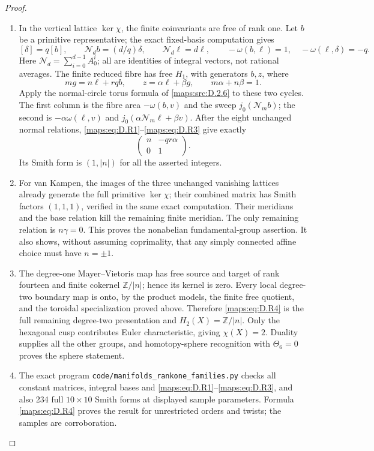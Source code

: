 \begin{proof}
\begin{enumerate}[label=\arabic*.,leftmargin=*]
\item In the vertical lattice $\ker\chi$, the finite coinvariants
are free of rank one. Let $b$ be a primitive representative;
the exact fixed-basis computation gives
\[
 [\delta]=q[b],\qquad
 \mathcal N_d b=(d/q)\delta,\qquad
 \mathcal N_d\ell=d\ell,\qquad
 -\omega(b,\ell)=1,\quad
 -\omega(\ell,\delta)=-q.
 \tag{D.R3}\label{maps:eq:D.R3}
\]
Here $\mathcal N_d=\sum_{i=0}^{d-1}A_0^i$; all are
identities of integral vectors, not rational averages.
The finite reduced fibre has free $H_1$, with generators
$b,z$, where
\[
 mg=n\ell+rq b,\qquad
 z=\alpha\ell+\beta g,\qquad m\alpha+n\beta=1.
\]
Apply the normal-circle torus formula of \ref{maps:src:D.2.6} to these two
cycles. The first column is the fibre area
$-\omega(b,v)$ and the sweep $j_0(\mathcal N_m b)$;
the second is $-\alpha\omega(\ell,v)$ and
$j_0(\alpha\mathcal N_m\ell+\beta v)$.
After the eight unchanged normal relations, \eqref{maps:eq:D.R1}--\eqref{maps:eq:D.R3}
give exactly
\[
 \begin{pmatrix}n&-qr\alpha\\0&1\end{pmatrix}.
 \tag{D.R4}\label{maps:eq:D.R4}
\]
Its Smith form is $(1,|n|)$ for all the asserted integers.

\item For van Kampen, the images of the three unchanged vanishing
lattices already generate the full primitive $\ker\chi$;
their combined matrix has Smith factors $(1,1,1)$, verified
in the same exact computation. Their meridians and the base
relation kill the remaining finite meridian. The only remaining
relation is $n\gamma=0$. This proves the nonabelian
fundamental-group assertion. It also shows, without assuming
coprimality, that any simply connected affine choice must have
$n=\pm1$.

\item The degree-one Mayer--Vietoris map has free source and target
of rank fourteen and finite cokernel $\mathbb Z/|n|$; hence
its kernel is zero. Every local degree-two boundary map is
onto, by the product models, the finite free quotient, and
the toroidal specialization proved above. Therefore \eqref{maps:eq:D.R4}
is the full remaining degree-two presentation and
$H_2(X)=\mathbb Z/|n|$.
Only the hexagonal cusp contributes Euler characteristic,
giving $\chi(X)=2$. Duality supplies all the other groups,
and homotopy-sphere recognition with $\Theta_6=0$ proves
the sphere statement.

\item The exact program \texttt{code/manifolds\_rankone\_families.py}
checks all constant matrices, integral bases and \eqref{maps:eq:D.R1}--\eqref{maps:eq:D.R3},
and also 234 full $10\times10$ Smith forms at displayed
sample parameters. Formula \eqref{maps:eq:D.R4} proves the result for
unrestricted orders and twists; the samples are corroboration.
\end{enumerate}
\end{proof}

